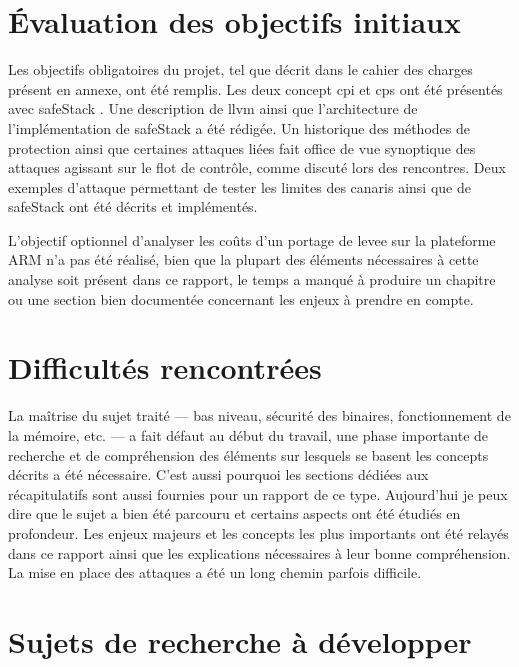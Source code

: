 \section{Évaluation des objectifs initiaux}

Les objectifs obligatoires du projet, tel que décrit dans le cahier des charges présent en
annexe, ont été remplis. Les deux concept \gls{cpi} et \gls{cps} ont été présentés
avec \og \gls{safeStack} \fg. Une description de \gls{llvm} ainsi que l'architecture
de l'implémentation de \og \gls{safeStack} \fg a été rédigée. Un historique des
méthodes de protection ainsi que certaines attaques liées fait office de vue
synoptique des attaques agissant sur le flot de contrôle, comme discuté lors des
rencontres. Deux exemples d'attaque permettant de tester les limites des canaris
ainsi que de \og \gls{safeStack} \fg ont été décrits et implémentés.

L'objectif optionnel d'analyser les coûts d'un portage de \gls{levee} sur la plateforme
ARM n'a pas été réalisé, bien que la plupart
des éléments nécessaires à cette analyse soit présent dans ce rapport, le temps
a manqué à produire un chapitre ou une section bien documentée concernant les
enjeux à prendre en compte.

\newpage

\section{Difficultés rencontrées}

La maîtrise du sujet traité --- bas niveau, sécurité des binaires, fonctionnement de
la mémoire, etc. --- a fait défaut au début du travail, une phase importante
de recherche et de compréhension des éléments sur lesquels se basent les
concepts décrits a été nécessaire. C'est aussi pourquoi les sections dédiées aux
récapitulatifs sont aussi fournies pour un rapport de ce type. Aujourd'hui je peux
dire que le sujet a bien été parcouru et certains aspects ont été
étudiés en profondeur. Les enjeux majeurs et les concepts les plus importants
ont été relayés dans ce rapport ainsi que les explications nécessaires à leur bonne
compréhension. La mise en place des attaques a été un long chemin parfois difficile.

\section{Sujets de recherche à développer}

